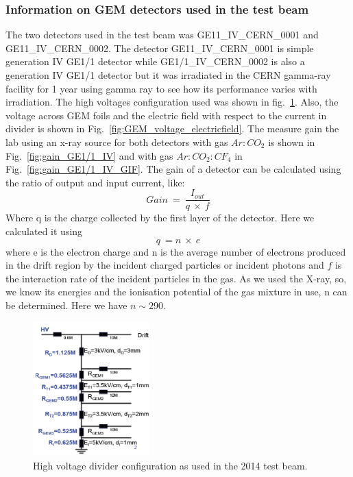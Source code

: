 \subsubsection{Information on GEM detectors used in the test beam} %
\label{ssub:information_of_gem_detectors_used_in_test_beam}
The two detectors used in the test beam was GE11\_IV\_CERN\_0001 and \\GE11\_IV\_CERN\_0002. 
The detector GE11\_IV\_CERN\_0001 is simple generation IV GE1/1 detector while GE1/1\_IV\_CERN\_0002 is also a generation IV GE1/1 detector but it was irradiated in the CERN gamma-ray facility for 1 year using gamma ray to see how its performance varies with irradiation. 
The high voltages configuration used was shown in fig.~\ref{fig:HV_configuration}. 
Also, the voltage across GEM foils and  the electric field  with respect to the current in divider is shown in Fig.~\ref{fig:GEM_voltage_electricfield}. 
The measure gain the lab using an x-ray source for both detectors with gas $Ar:CO_2$ is shown in Fig.~\ref{fig:gain_GE1/1_IV} and with gas $Ar:CO_2:CF_4$ in Fig.~\ref{fig:gain_GE1/1_IV_GIF}. 
The gain of a detector can be calculated using the ratio of output and input current, like:
\begin{equation}
    Gain~=~\frac{I_{out}}{q~\times~f}
\end{equation}
Where q is the charge collected by the first layer of the detector. Here we calculated it using
\begin{equation}
    q~= n~\times~e
\end{equation}
where e is the electron charge and n is the average number of electrons produced in the drift region by the incident charged particles or incident photons and $f$ is the interaction rate of the incident particles in the gas. As we used the X-ray, so, we know its energies and the ionisation potential of the gas mixture in use, n can be determined. Here we have $n\sim 290$.
\begin{figure}[htbp]
    \centering
    \includegraphics[width=0.40\textwidth]{figures/GEM/HV_divider_gem_testbeam_2014.jpeg}
    \caption{High voltage divider configuration as used in the 2014 test beam.}
    \label{fig:HV_configuration}
\end{figure}
